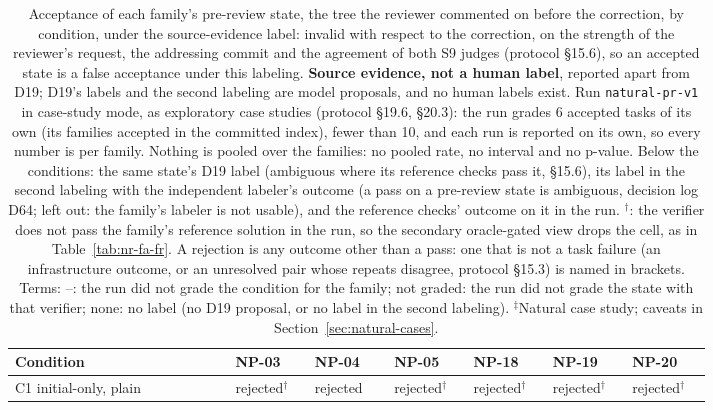 \begin{table}[t]\centering\footnotesize
\caption{Acceptance of each family's pre-review state, the tree the reviewer commented on before the correction, by condition, under the source-evidence label: invalid with respect to the correction, on the strength of the reviewer's request, the addressing commit and the agreement of both S9 judges (protocol \S15.6), so an accepted state is a false acceptance under this labeling. \textbf{Source evidence, not a human label}, reported apart from D19; D19's labels and the second labeling are model proposals, and no human labels exist. Run \texttt{natural-pr-v1} in case-study mode, as exploratory case studies (protocol \S19.6, \S20.3): the run grades 6 accepted tasks of its own (its families accepted in the committed index), fewer than 10, and each run is reported on its own, so every number is per family. Nothing is pooled over the families: no pooled rate, no interval and no p-value. Below the conditions: the same state's D19 label (ambiguous where its reference checks pass it, \S15.6), its label in the second labeling with the independent labeler's outcome (a pass on a pre-review state is ambiguous, decision log D64; left out: the family's labeler is not usable), and the reference checks' outcome on it in the run. $^{\dagger}$: the verifier does not pass the family's reference solution in the run, so the secondary oracle-gated view drops the cell, as in Table~\ref{tab:nr-fa-fr}. A rejection is any outcome other than a pass: one that is not a task failure (an infrastructure outcome, or an unresolved pair whose repeats disagree, protocol \S15.3) is named in brackets. Terms: --: the run did not grade the condition for the family; not graded: the run did not grade the state with that verifier; none: no label (no D19 proposal, or no label in the second labeling). $^{\ddagger}$Natural case study; caveats in Section~\ref{sec:natural-cases}.}\label{tab:nr-source}
\begin{tabular}{p{0.25\linewidth}p{0.093\linewidth}p{0.093\linewidth}p{0.093\linewidth}p{0.093\linewidth}p{0.093\linewidth}p{0.093\linewidth}}\toprule Condition & NP-03 & NP-04 & NP-05 & NP-18 & NP-19 & NP-20 \\\midrule
\raggedright\hspace{0pt}C1 initial-only, plain & \raggedright\hspace{0pt}rejected$^{\dagger}$ & \raggedright\hspace{0pt}rejected & \raggedright\hspace{0pt}rejected$^{\dagger}$ & \raggedright\hspace{0pt}rejected$^{\dagger}$ & \raggedright\hspace{0pt}rejected$^{\dagger}$ & \raggedright\hspace{0pt}rejected$^{\dagger}$ \tabularnewline

\end{tabular}
\end{table}
